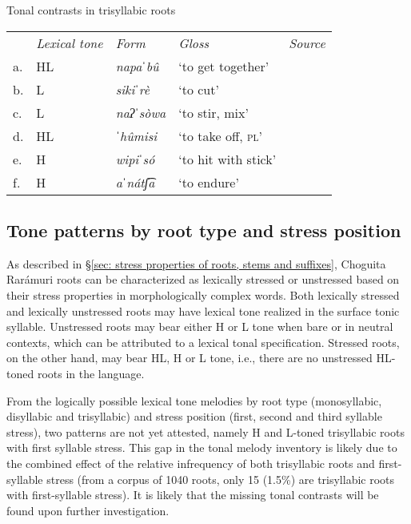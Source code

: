 
\ea\label{ex: tonal contrasts in trisyllabic roots}
{Tonal contrasts in trisyllabic roots}

\begin{tabularx}{.9\textwidth}{lQlll}
       & \textit{Lexical tone} & \textit{Form} & \textit{Gloss} & \textit{Source}\\
    a. & HL & {\textit{napaˈbû}}&{‘to get together’}&\\
    b. & L & \textit{sikiˈrè}&{‘to cut’}&\\
    c. & L & \textit{naʔˈsòwa}&{‘to stir, mix’}&\\
    d. & HL & \textit{ˈhûmisi}&{‘to take off, \textsc{pl}’} &\\
    e. & H & \textit{wipiˈsó}& `to hit with stick'&\\
    f. & H & \textit{aˈnátʃ͡a}&`to endure'&\\
\end{tabularx}

\z

\subsection{Tone patterns by root type and stress position}
\label{subsec: tone melodies by root type and stress position}

As described in §\ref{sec: stress properties of roots, stems and suffixes}, Choguita Rarámuri roots can be characterized as lexically stressed or unstressed based on their stress properties in morphologically complex words. Both lexically stressed and lexically unstressed roots may have lexical tone realized in the surface tonic syllable. Unstressed roots may bear either H or L tone when bare or in neutral contexts, which can be attributed to a lexical tonal specification. Stressed roots, on the other hand, may bear HL, H or L tone, i.e., there are no unstressed HL-toned roots in the language.

From the logically possible lexical tone melodies by root type (monosyllabic, disyllabic and trisyllabic) and stress position (first, second and third syllable stress), two patterns are not yet attested, namely H and L-toned trisyllabic roots with first syllable stress. This gap in the tonal melody inventory is likely due to the combined effect of the relative infrequency of both trisyllabic roots and first-syllable stress (from a corpus of 1040 roots, only 15 (1.5\%) are trisyllabic roots with first-syllable stress). It is likely that the missing tonal contrasts will be found upon further investigation.

